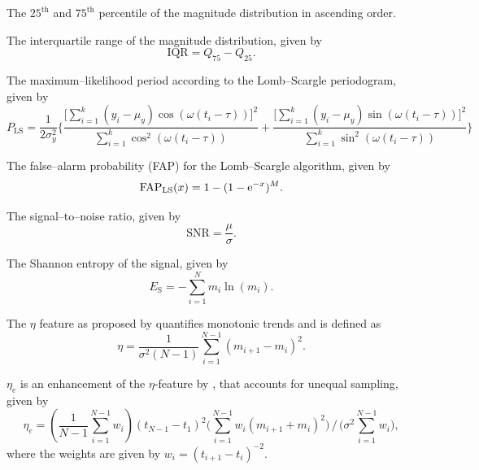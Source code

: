 \begin{enumerate}
 The $25^\text{th}$ and $75^\text{th}$ percentile of the magnitude distribution in ascending order.

 The interquartile range of the magnitude distribution, given by
\begin{equation}\text{IQR} = Q_{75} -Q_{25}.\end{equation}

 The maximum--likelihood period according to the Lomb--Scargle periodogram, given by
\begin{equation}P_{\text{LS}} = \frac{1}{2 \sigma_y^2} \Bigg\{ \frac{\big[\sum\limits_{i=1}^k (y_i - \mu_y) \cos(\omega(t_i - \tau))\big]^2}{\sum\limits_{i=1}^k \cos^2(\omega(t_i - \tau))} + \frac{\big[\sum\limits_{i=1}^k (y_i - \mu_y) \sin(\omega(t_i - \tau))\big]^2}{\sum\limits_{i=1}^k \sin^2(\omega(t_i - \tau))}\Bigg\}\end{equation}

 The false--alarm probability (FAP) for the Lomb--Scargle algorithm, given by
\begin{equation}\text{FAP}_{\text{LS}}(x) = 1 - (1 - \mathrm{e}^{-x})^M.\end{equation}

 The signal--to--noise ratio, given by
\begin{equation}\text{SNR} = \frac{\mu}{\sigma}.\end{equation}

 The Shannon entropy \citep{shannon1949} of the signal, given by
\begin{equation}E_\text{S} = -\sum\limits_{i=1}^N m_i \ln(m_i).\end{equation}

 The $\eta$ feature as proposed by \citet{vonneumann1941} quantifies monotonic trends and is defined as
\begin{equation}\eta = \frac{1}{\sigma^2 (N-1)} \sum\limits_{i=1}^{N-1} (m_{i+1} - m_{i})^2.\end{equation}

 $\eta_e$ is an enhancement of the $\eta$-feature by \citet{kim2014}, that accounts for unequal sampling, given by
\begin{equation}\eta_e = (\frac{1}{N-1}\sum_{i=1}^{N-1} w_i) (t_{N-1} - t_1)^2 \big( \sum\limits_{i=1}^{N-1} w_i (m_{i+1} + m_i)^2 \big) \, / \, \big( \sigma^2 \sum\limits_{i=1}^{N-1} w_i \big),\end{equation}
where the weights are given by $w_i = (t_{i+1} - t_i)^{-2}$.


\end{enumerate}
